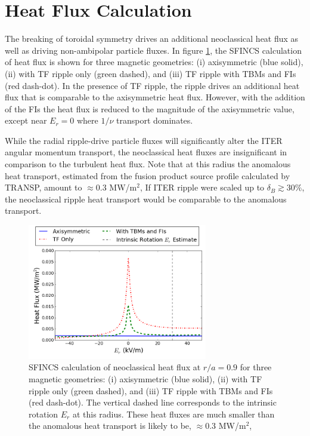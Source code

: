 \documentclass{article}
\begin{document}
\FloatBarrier

\section{Heat Flux Calculation}\label{heatflux}
The breaking of toroidal symmetry drives an additional neoclassical heat flux as well as driving non-ambipolar particle fluxes. In figure \ref{fig:HeatFlux}, the SFINCS calculation of heat flux is shown for three magnetic geometries: (i) axisymmetric (blue solid), (ii) with TF ripple only (green dashed), and (iii) TF ripple with TBMs and FIs (red dash-dot). In the presence of TF ripple, the ripple drives an additional heat flux that is comparable to the axisymmetric heat flux. However, with the addition of the FIs the heat flux is reduced to the magnitude of the axisymmetric value, except near $E_r = 0$ where $1/\nu$ transport dominates. 

While the radial ripple-drive particle fluxes will significantly alter the ITER angular momentum transport, the neoclassical heat fluxes are insignificant in comparison to the turbulent heat flux. Note that at this radius the anomalous heat transport, estimated from the fusion product source profile calculated by TRANSP, amount to $\approx 0.3$ MW/m$^2$, If ITER ripple were scaled up to $\delta_B \gtrsim 30\%$, the neoclassical ripple heat transport would be comparable to the anomalous transport.

\begin{figure}[h!]
\centering
\includegraphics[width=0.7\textwidth]
{HeatFlux.png}
\caption{\label{fig:HeatFlux} SFINCS calculation of neoclassical heat flux at $r/a = 0.9$ for three magnetic geometries: (i) axisymmetric (blue solid), (ii) with TF ripple only (green dashed), and (iii) TF ripple with TBMs and FIs (red dash-dot). The vertical dashed line corresponds to the intrinsic rotation $E_r$ at this radius. These heat fluxes are much smaller than the anomalous heat transport is likely to be, $\approx 0.3$ MW/m$^2$,}
\end{figure}
\end{document}
